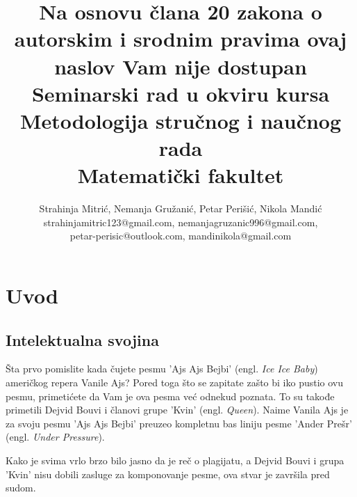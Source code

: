\documentclass[a4paper]{article}
\begin{document}
\title{\vspace{-3.0cm}Na osnovu člana 20 zakona o autorskim i srodnim pravima ovaj naslov Vam nije dostupan\\
\large \vspace{0.5cm}Seminarski rad u okviru kursa\\Metodologija stručnog i naučnog rada\\ Matematički fakultet}

\author{Strahinja Mitrić, Nemanja Gružanić, Petar Perišić, Nikola Mandić\\ strahinjamitric123@gmail.com, nemanjagruzanic996@gmail.com,\\ petar-perisic@outlook.com, mandinikola@gmail.com
}

\maketitle

\tableofcontents

\newpage

\section{Uvod}
\label{sec:uvod}
\subsection{Intelektualna svojina}
Šta prvo pomislite kada čujete pesmu 'Ajs Ajs Bejbi' (engl. \emph{Ice Ice Baby}) američkog repera Vanile Ajs?
Pored toga što se zapitate zašto bi iko pustio ovu pesmu, primetićete da Vam je ova pesma već odnekud poznata.
To su takođe primetili Dejvid Bouvi i članovi grupe 'Kvin' (engl. \emph{Queen}).
Naime Vanila Ajs je za svoju pesmu 'Ajs Ajs Bejbi' preuzeo kompletnu bas liniju pesme 'Ander Prešr' (engl. \emph{Under Pressure}).

Kako je svima vrlo brzo bilo jasno da je reč o plagijatu, a Dejvid Bouvi i grupa 'Kvin' nisu dobili
zasluge za komponovanje pesme, ova stvar je završila pred sudom.
\end{document}
